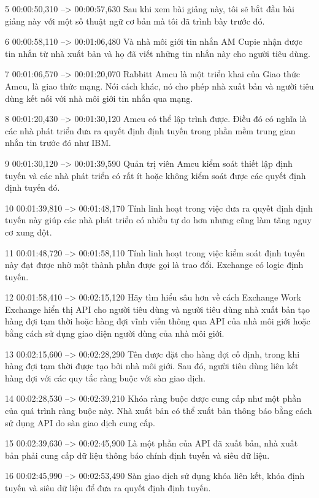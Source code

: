 5
00:00:50,310 --> 00:00:57,630
Sau khi xem bài giảng này, tôi sẽ bắt đầu bài giảng này với một số thuật ngữ cơ bản mà tôi đã trình bày trước đó.

6
00:00:58,110 --> 00:01:06,480
Và nhà môi giới tin nhắn AM Cupie nhận được tin nhắn từ nhà xuất bản và họ đã viết những tin nhắn này cho người tiêu dùng.

7
00:01:06,570 --> 00:01:20,070
Rabbitt Amcu là một triển khai của Giao thức Amcu, là giao thức mạng.  Nói cách khác, nó cho phép nhà xuất bản và người tiêu dùng kết nối với nhà môi giới tin nhắn qua mạng.

8
00:01:20,430 --> 00:01:30,120
Amcu có thể lập trình được.  Điều đó có nghĩa là các nhà phát triển đưa ra quyết định định tuyến trong phần mềm trung gian nhắn tin trước đó như IBM.

9
00:01:30,120 --> 00:01:39,590
Quản trị viên Amcu kiểm soát thiết lập định tuyến và các nhà phát triển có rất ít hoặc không kiểm soát được các quyết định định tuyến đó.

10
00:01:39,810 --> 00:01:48,170
Tính linh hoạt trong việc đưa ra quyết định định tuyến này giúp các nhà phát triển có nhiều tự do hơn nhưng cũng làm tăng nguy cơ xung đột.

11
00:01:48,720 --> 00:01:58,110
Tính linh hoạt trong việc kiểm soát định tuyến này đạt được nhờ một thành phần được gọi là trao đổi.  Exchange có logic định tuyến.

12
00:01:58,410 --> 00:02:15,120
Hãy tìm hiểu sâu hơn về cách Exchange Work Exchange hiển thị API cho người tiêu dùng và người tiêu dùng nhà xuất bản tạo hàng đợi tạm thời hoặc hàng đợi vĩnh viễn thông qua API của nhà môi giới hoặc bằng cách sử dụng giao diện người dùng của nhà môi giới.

13
00:02:15,600 --> 00:02:28,290
Tên được đặt cho hàng đợi cố định, trong khi hàng đợi tạm thời được tạo bởi nhà môi giới.  Sau đó, người tiêu dùng liên kết hàng đợi với các quy tắc ràng buộc với sàn giao dịch.

14
00:02:28,530 --> 00:02:39,210
Khóa ràng buộc được cung cấp như một phần của quá trình ràng buộc này.  Nhà xuất bản có thể xuất bản thông báo bằng cách sử dụng API do sàn giao dịch cung cấp.

15
00:02:39,630 --> 00:02:45,900
Là một phần của API đã xuất bản, nhà xuất bản phải cung cấp dữ liệu thông báo chính định tuyến và siêu dữ liệu.

16
00:02:45,990 --> 00:02:53,490
Sàn giao dịch sử dụng khóa liên kết, khóa định tuyến và siêu dữ liệu để đưa ra quyết định định tuyến.

